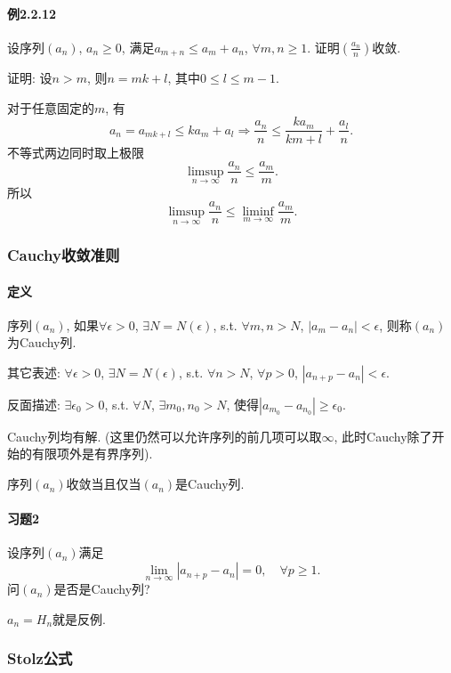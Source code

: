 \paragraph{例2.2.12}

设序列$\left(a_{n}\right)$, $a_{n}\ge0$, 满足$a_{m+n}\le a_{m}+a_{n}$,
$\forall m,n\ge1$. 证明$\left(\frac{a_{n}}{n}\right)$收敛.

证明: 设$n>m$, 则$n=mk+l$, 其中$0\le l\le m-1$. 

对于任意固定的$m$, 有
\[
a_{n}=a_{mk+l}\le ka_{m}+a_{l}\Longrightarrow\frac{a_{n}}{n}\le\frac{ka_{m}}{km+l}+\frac{a_{l}}{n}.
\]
不等式两边同时取上极限
\[
\limsup_{n\to\infty}\frac{a_{n}}{n}\le\frac{a_{m}}{m}.
\]
所以
\[
\limsup_{n\to\infty}\frac{a_{n}}{n}\le\liminf_{m\to\infty}\frac{a_{m}}{m}.
\]


\subsubsection{Cauchy收敛准则}

\paragraph{定义}

序列$\left(a_{n}\right)$, 如果$\forall\epsilon>0$, $\exists N=N(\epsilon)$,
s.t. $\forall m,n>N$, $\left|a_{m}-a_{n}\right|<\epsilon$, 则称$\left(a_{n}\right)$为Cauchy列.

其它表述: $\forall\epsilon>0$, $\exists N=N(\epsilon)$, s.t. $\forall n>N$,
$\forall p>0$, $\left|a_{n+p}-a_{n}\right|<\epsilon$.

反面描述: $\exists\epsilon_{0}>0$, s.t. $\forall N$, $\exists m_{0},n_{0}>N$,
使得$\left|a_{m_{0}}-a_{n_{0}}\right|\ge\epsilon_{0}$.

Cauchy列均有解. (这里仍然可以允许序列的前几项可以取$\infty$, 此时Cauchy除了开始的有限项外是有界序列).

序列$\left(a_{n}\right)$收敛当且仅当$\left(a_{n}\right)$是Cauchy列.

\paragraph{习题2}

设序列$\left(a_{n}\right)$满足
\[
\lim_{n\to\infty}\left|a_{n+p}-a_{n}\right|=0,\quad\forall p\ge1.
\]
问$\left(a_{n}\right)$是否是Cauchy列?

$a_{n}=H_{n}$就是反例.

\subsubsection{Stolz公式}


